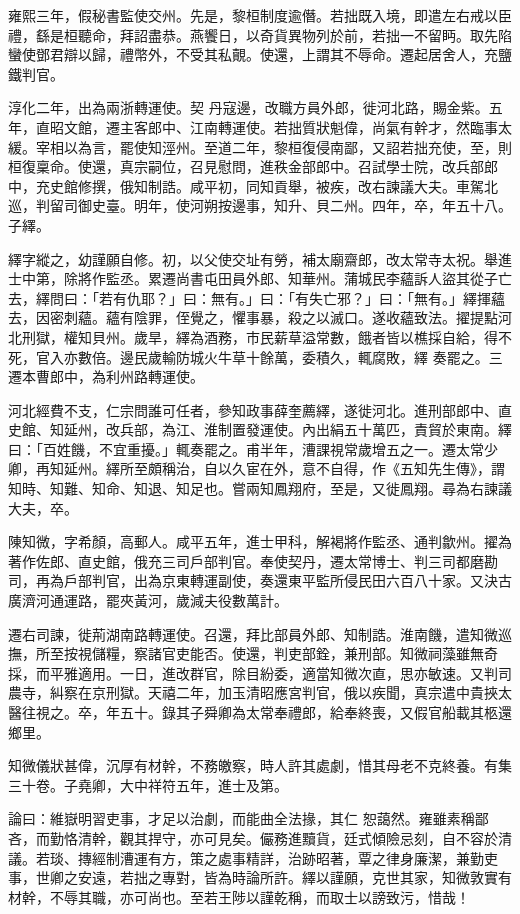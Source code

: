 \begin{pinyinscope}
 雍熙三年，假秘書監使交州。先是，黎桓制度逾僭。若拙既入境，即遣左右戒以臣禮，繇是桓聽命，拜詔盡恭。燕饗日，以奇貨異物列於前，若拙一不留眄。取先陷蠻使鄧君辯以歸，禮幣外，不受其私覿。使還，上謂其不辱命。遷起居舍人，充鹽鐵判官。



 淳化二年，出為兩浙轉運使。契
 丹寇邊，改職方員外郎，徙河北路，賜金紫。五年，直昭文館，遷主客郎中、江南轉運使。若拙質狀魁偉，尚氣有幹才，然臨事太緩。宰相以為言，罷使知涇州。至道二年，黎桓復侵南鄙，又詔若拙充使，至，則桓復稟命。使還，真宗嗣位，召見慰問，進秩金部郎中。召試學士院，改兵部郎中，充史館修撰，俄知制誥。咸平初，同知貢舉，被疾，改右諫議大夫。車駕北巡，判留司御史臺。明年，使河朔按邊事，知升、貝二州。四年，卒，年五十八。子繹。



 繹字縱之，幼謹願自修。初，以父使交址有勞，補太廟齋郎，改太常寺太祝。舉進士中第，除將作監丞。累遷尚書屯田員外郎、知華州。蒲城民李蘊訴人盜其從子亡去，繹問曰：「若有仇耶？」曰：無有。」曰：「有失亡邪？」曰：「無有。」繹揮蘊去，因密刺蘊。蘊有陰罪，侄覺之，懼事暴，殺之以滅口。遂收蘊致法。擢提點河北刑獄，權知貝州。歲旱，繹為酒務，市民薪草溢常數，餓者皆以樵採自給，得不死，官入亦數倍。邊民歲輸防城火牛草十餘萬，委積久，輒腐敗，繹
 奏罷之。三遷本曹郎中，為利州路轉運使。



 河北經費不支，仁宗問誰可任者，參知政事薛奎薦繹，遂徙河北。進刑部郎中、直史館、知延州，改兵部，為江、淮制置發運使。內出絹五十萬匹，責貿於東南。繹曰：「百姓饑，不宜重擾。」輒奏罷之。甫半年，漕課視常歲增五之一。遷太常少卿，再知延州。繹所至頗稱治，自以久宦在外，意不自得，作《五知先生傳》，謂知時、知難、知命、知退、知足也。嘗兩知鳳翔府，至是，又徙鳳翔。尋為右諫議大夫，卒。



 陳知微，字希顏，高郵人。咸平五年，進士甲科，解褐將作監丞、通判歙州。擢為著作佐郎、直史館，俄充三司戶部判官。奉使契丹，遷太常博士、判三司都磨勘司，再為戶部判官，出為京東轉運副使，奏還東平監所侵民田六百八十家。又決古廣濟河通運路，罷夾黃河，歲減夫役數萬計。



 遷右司諫，徙荊湖南路轉運使。召還，拜比部員外郎、知制誥。淮南饑，遣知微巡撫，所至按視儲糧，察諸官吏能否。使還，判吏部銓，兼刑部。知微祠藻雖無奇
 採，而平雅適用。一日，進改群官，除目紛委，適當知微次直，思亦敏速。又判司農寺，糾察在京刑獄。天禧二年，加玉清昭應宮判官，俄以疾聞，真宗遣中貴挾太醫往視之。卒，年五十。錄其子舜卿為太常奉禮郎，給奉終喪，又假官船載其柩還鄉里。



 知微儀狀甚偉，沉厚有材幹，不務皦察，時人許其處劇，惜其母老不克終養。有集三十卷。子堯卿，大中祥符五年，進士及第。



 論曰：維嶽明習吏事，才足以治劇，而能曲全法掾，其仁
 恕藹然。雍雖素稱鄙吝，而勤恪清幹，觀其捍守，亦可見矣。儼務進黷貨，廷式傾險忌刻，自不容於清議。若琰、摶經制漕運有方，策之處事精詳，治跡昭著，覃之律身廉潔，兼勤吏事，世卿之安遠，若拙之專對，皆為時論所許。繹以謹願，克世其家，知微敦實有材幹，不辱其職，亦可尚也。至若王陟以謹乾稱，而取士以謗致污，惜哉！



\end{pinyinscope}